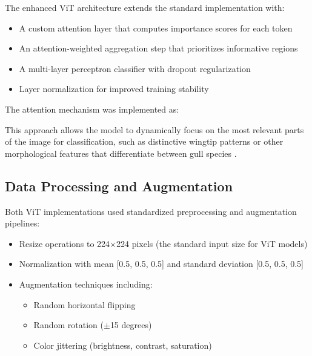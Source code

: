 \documentclass[a4paper,12pt]{article}
\begin{document}
The enhanced ViT architecture extends the standard implementation with:

\begin{itemize}
    \item A custom attention layer that computes importance scores for each token
    \item An attention-weighted aggregation step that prioritizes informative regions
    \item A multi-layer perceptron classifier with dropout regularization
    \item Layer normalization for improved training stability
\end{itemize}

The attention mechanism was implemented as:


This approach allows the model to dynamically focus on the most relevant parts of the image for classification, such as distinctive wingtip patterns or other morphological features that differentiate between gull species \citep{stassin2024explainability}.

\subsection{Data Processing and Augmentation}

Both ViT implementations used standardized preprocessing and augmentation pipelines:

\begin{itemize}
    \item Resize operations to 224$\times$224 pixels (the standard input size for ViT models)
    \item Normalization with mean [0.5, 0.5, 0.5] and standard deviation [0.5, 0.5, 0.5]
    \item Augmentation techniques including:
    \begin{itemize}
        \item Random horizontal flipping
        \item Random rotation ($\pm$15 degrees)
        \item Color jittering (brightness, contrast, saturation)
    \end{itemize}
\end{itemize}
\end{document}
